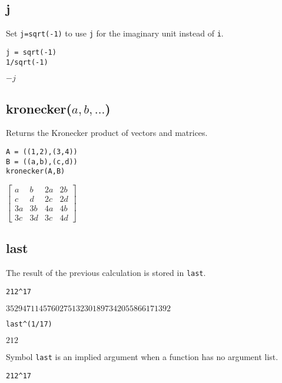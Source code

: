 \documentclass[12pt]{article}
\begin{document}
\subsection*{j}

Set {\tt j=sqrt(-1)} to use {\tt j} for the imaginary unit instead of {\tt i}.

{\color{blue}
\begin{verbatim}
j = sqrt(-1)
1/sqrt(-1)
\end{verbatim}
}

\noindent
$-j$

\subsection*{kronecker($a,b,\ldots$)}

Returns the Kronecker product of vectors and matrices.

{\color{blue}
\begin{verbatim}
A = ((1,2),(3,4))
B = ((a,b),(c,d))
kronecker(A,B)
\end{verbatim}
}

\noindent
$\displaystyle
\begin{bmatrix}
a & b & 2a & 2b
\\[1ex]
c & d & 2c & 2d
\\[1ex]
3a & 3b & 4a & 4b
\\[1ex]
3c & 3d & 3c & 4d
\end{bmatrix}
$

\subsection*{last}

The result of the previous calculation is stored in {\tt last}.

{\color{blue}
\begin{verbatim}
212^17
\end{verbatim}
}

\noindent
$3529471145760275132301897342055866171392$

{\color{blue}
\begin{verbatim}
last^(1/17)
\end{verbatim}
}

\noindent
$212$

\bigskip
\noindent
Symbol \verb$last$ is an implied argument when a function has no argument list.

{\color{blue}
\begin{verbatim}
212^17
\end{verbatim}
}
\end{document}
